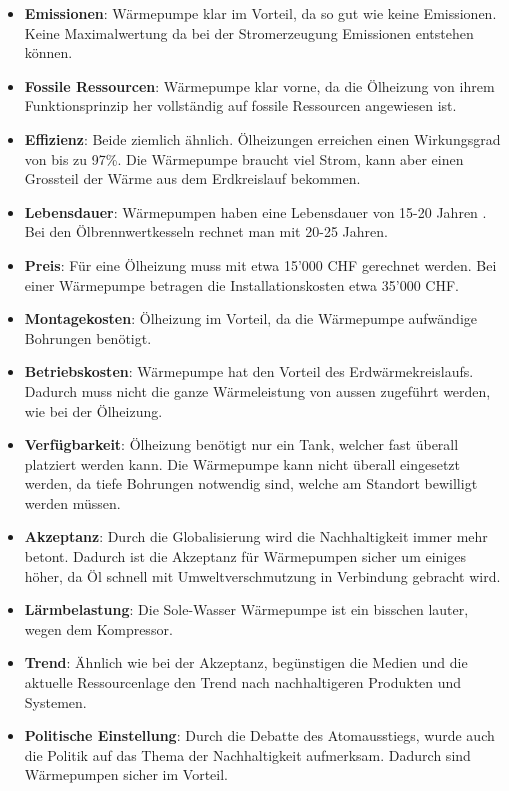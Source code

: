 \begin{itemize}

\item \textbf{Emissionen}: Wärmepumpe klar im Vorteil, da so gut wie keine Emissionen. Keine Maximalwertung da bei der Stromerzeugung Emissionen entstehen können.

\item \textbf{Fossile Ressourcen}: Wärmepumpe klar vorne, da die Ölheizung von ihrem Funktionsprinzip her vollständig auf fossile Ressourcen angewiesen ist.

\item \textbf{Effizienz}: Beide ziemlich ähnlich. Ölheizungen erreichen einen Wirkungsgrad von bis zu 97\%. Die Wärmepumpe braucht viel Strom, kann aber einen Grossteil der Wärme aus dem Erdkreislauf bekommen.

\item \textbf{Lebensdauer}: Wärmepumpen haben eine Lebensdauer von 15-20 Jahren \cite{fws:faq}. Bei den Ölbrennwertkesseln rechnet man mit 20-25 Jahren\cite{offerten24:oel}.

\item \textbf{Preis}: Für eine Ölheizung muss mit etwa 15'000 CHF\cite{offerten24:oel} gerechnet werden. Bei einer Wärmepumpe betragen die Installationskosten etwa 35'000 CHF.\cite{offerten24:wp}

\item \textbf{Montagekosten}: Ölheizung im Vorteil, da die Wärmepumpe aufwändige Bohrungen benötigt.

\item \textbf{Betriebskosten}: Wärmepumpe hat den Vorteil des Erdwärmekreislaufs. Dadurch muss nicht die ganze Wärmeleistung von aussen zugeführt werden, wie bei der Ölheizung.

\item \textbf{Verfügbarkeit}: Ölheizung benötigt nur ein Tank, welcher fast überall platziert werden kann. Die Wärmepumpe kann nicht überall eingesetzt werden, da tiefe Bohrungen notwendig sind, welche am Standort bewilligt werden müssen. 

\item \textbf{Akzeptanz}: Durch die Globalisierung wird die Nachhaltigkeit immer mehr betont. Dadurch ist die Akzeptanz für Wärmepumpen sicher um einiges höher, da Öl schnell mit Umweltverschmutzung in Verbindung gebracht wird.

\item \textbf{Lärmbelastung}: Die Sole-Wasser Wärmepumpe ist ein bisschen lauter, wegen dem Kompressor. 

\item \textbf{Trend}: Ähnlich wie bei der Akzeptanz, begünstigen die Medien und die aktuelle Ressourcenlage den Trend nach nachhaltigeren Produkten und Systemen.

\item \textbf{Politische Einstellung}: Durch die Debatte des Atomausstiegs, wurde auch die Politik auf das Thema der Nachhaltigkeit aufmerksam. Dadurch sind Wärmepumpen sicher im Vorteil.

\end{itemize}
